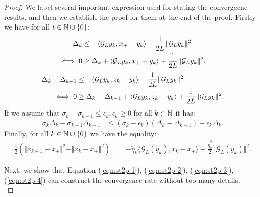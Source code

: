 \documentclass[12pt]{article}
\begin{document}
    \begin{proof}
        We label several important expression used for stating the convergecne results, and then we establish the proof for them at the end of the proof. 
        Firstly we have for all $t \in \mathbb N\cup \{0\}$: 
        \begin{align}
            \Delta_k &\le
            - \langle \mathcal G_L y_k, x_+ - y_k \rangle - \frac{1}{2L} \Vert \mathcal G_L y_k\Vert^2
            \notag
            \\
            \iff 
            0& \ge 
            \Delta_k + \langle \mathcal G_L y_k, x_+ - y_k\rangle + \frac{1}{2L}\Vert \mathcal G_L y_k\Vert^2. 
            \label{eqn:st2p-1}
        \end{align}
        \begin{align}
            \Delta_k - \Delta_{k -1} 
            &\le 
            - \langle \mathcal G_L y_k, z_k - y_k\rangle - \frac{1}{2L}\Vert \mathcal G_L y_k\Vert^2
            \notag
            \\
            \iff 
            0 &\ge
            \Delta_k - \Delta_{k - 1}
            + \langle \mathcal G_L y_k, z_k - y_k\rangle
            + \frac{1}{2L} \Vert \mathcal G_L y_k \Vert^2. 
            \label{eqn:st2p-2}
        \end{align}
        If we assume that $\sigma_k - \sigma_{k - 1} \le \epsilon_k, \epsilon_k \ge 0$ for all $k \in \mathbb N$ it has: 
        \begin{align}
            \sigma_k\Delta_k - \sigma_{k -1}\Delta_{k -1}
            &\le 
            (\sigma_k - \epsilon_k)(\Delta_k - \Delta_{k -1}) + \epsilon_k \Delta_k. 
            \label{eqn:st2p-3}
        \end{align}
        Finally, for all $k \in \mathbb N \cup \{0\}$ we have the equality: 
        \begin{align}
            \frac{1}{2}
            (
                \Vert x_{k + 1} - x_+\Vert^2 - \Vert x_k - x_+\Vert^2
            )
            &= 
            - \tilde \eta_k \langle \mathcal G_L(y_k), x_k - x_+\rangle
            + \frac{\tilde \eta_k^2}{2}\Vert \mathcal G_L(y_k)\Vert^2. 
            \label{eqn:st2p-4}
        \end{align}
        \par
        Next, we show that 
        Equation (\ref*{eqn:st2p-1}), 
        (\ref*{eqn:st2p-2}), 
        (\ref*{eqn:st2p-3}), 
        (\ref*{eqn:st2p-4}) 
        can construct the convergence rate without too many details. 
        \\

\end{proof}
\end{document}
